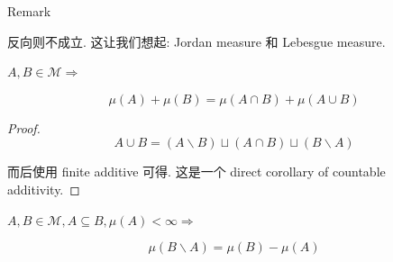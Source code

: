 \documentclass{qlnotes-export}
\begin{document}
\begin{qlremark}{Remark}

反向则不成立. 这让我们想起: Jordan measure 和 Lebesgue measure.

\end{qlremark}

\begin{lemma}\label{lem-01-sigma-algebra-measure-lemma-005}

\(A,B \in \mathcal{M}\Longrightarrow\)

\[\mu(A) + \mu(B) = \mu(A \cap B) + \mu(A \cup B)\]

\end{lemma}

\begin{proof}

\[A \cup B = (A\backslash B) \sqcup (A \cap B) \sqcup (B\backslash A)\]

而后使用 finite additive 可得. 这是一个 direct corollary of countable additivity.

\end{proof}

\begin{corollary}\label{cor-01-sigma-algebra-measure-corollary-002}

\(A,B \in \mathcal{M},A \subseteq B,\mu(A) < \infty\Longrightarrow\)

\[\mu(B\backslash A) = \mu(B) - \mu(A)\]

\end{corollary}
\end{document}
